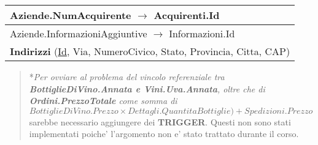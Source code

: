 \begin{center}
\begin{minipage}[t]{7.5cm}
{\begin{tabular}{P{7.5cm}}
				\midrule
				Aziende.NumAcquirente $\to$ Acquirenti.Id                                                                                                          \\
				\midrule
				Aziende.InformazioniAggiuntive $\to$ Informazioni.Id                                                                                               \\
				\midrule
				 \textbf{Indirizzi} (\underline{Id}, Via, NumeroCivico, Stato, Provincia, Citta, CAP)                              \\
				\midrule
			\end{tabular}
		}
	\end{minipage}


	\begin{verse}
		*\emph{Per ovviare al problema del vincolo referenziale tra 	\textbf{BottiglieDiVino.Annata e Vini.Uva.Annata}, oltre che di \textbf{Ordini.PrezzoTotale} come somma di $BottiglieDiVino.Prezzo \times Dettagli.QuantitaBottiglie)+ Spedizioni.Prezzo$} sarebbe necessario aggiungere dei \textbf{TRIGGER}. Questi non sono stati implementati poiche' l'argomento non e' stato trattato durante il corso.
	\end{verse}

\end{center}
